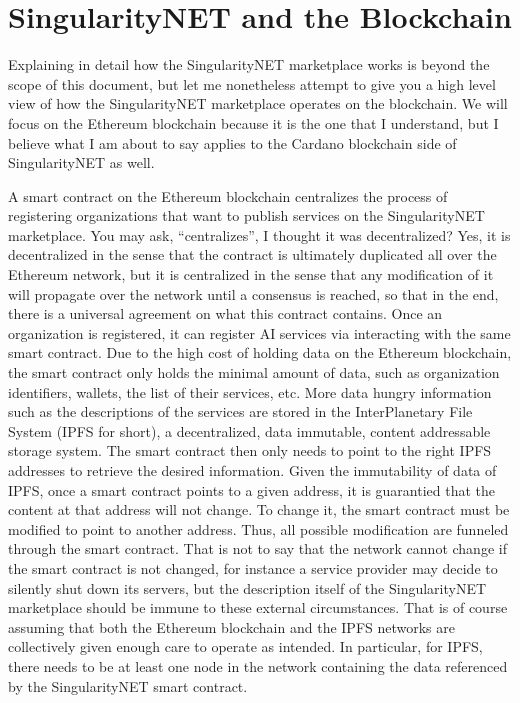 \documentclass[]{report}
\begin{document}
\section{SingularityNET and the Blockchain}
Explaining in detail how the SingularityNET marketplace works is
beyond the scope of this document, but let me nonetheless attempt to
give you a high level view of how the SingularityNET marketplace
operates on the blockchain.  We will focus on the Ethereum blockchain
because it is the one that I understand, but I believe what I am about
to say applies to the Cardano blockchain side of SingularityNET as
well.

A smart contract on the Ethereum blockchain centralizes the process of
registering organizations that want to publish services on the
SingularityNET marketplace.  You may ask, ``centralizes'', I thought
it was decentralized?  Yes, it is decentralized in the sense that the
contract is ultimately duplicated all over the Ethereum network, but
it is centralized in the sense that any modification of it will
propagate over the network until a consensus is reached, so that in
the end, there is a universal agreement on what this contract
contains.  Once an organization is registered, it can register AI
services via interacting with the same smart contract.  Due to the
high cost of holding data on the Ethereum blockchain, the smart
contract only holds the minimal amount of data, such as organization
identifiers, wallets, the list of their services, etc.  More data
hungry information such as the descriptions of the services are stored
in the InterPlanetary File System (IPFS for short), a decentralized,
data immutable, content addressable storage system.  The smart
contract then only needs to point to the right IPFS addresses to
retrieve the desired information.  Given the immutability of data of
IPFS, once a smart contract points to a given address, it is
guarantied that the content at that address will not change.  To
change it, the smart contract must be modified to point to another
address.  Thus, all possible modification are funneled through the
smart contract.  That is not to say that the network cannot change if
the smart contract is not changed, for instance a service provider may
decide to silently shut down its servers, but the description itself
of the SingularityNET marketplace should be immune to these external
circumstances.  That is of course assuming that both the Ethereum
blockchain and the IPFS networks are collectively given enough care to
operate as intended.  In particular, for IPFS, there needs to be at
least one node in the network containing the data referenced by the
SingularityNET smart contract.
\end{document}
